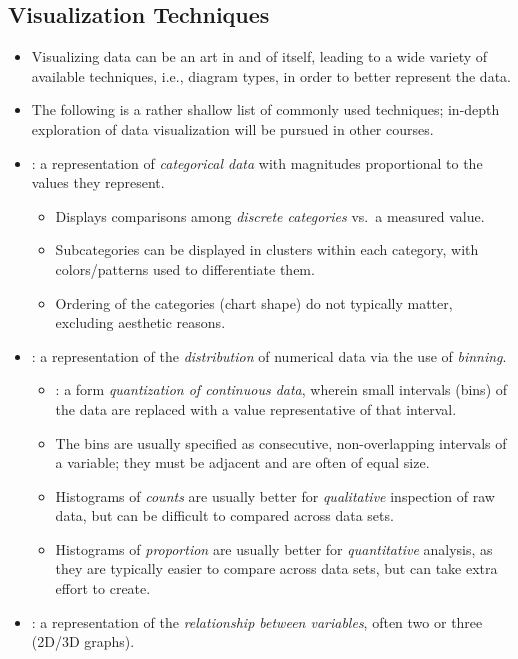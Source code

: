 \begin{itemize}
  \subsection{Visualization Techniques}
  \begin{itemize}
    \item Visualizing data can be an art in and of itself, leading to a wide variety of available techniques, i.e., diagram types, in order to better represent the data.
    \item The following is a rather shallow list of commonly used techniques; in-depth exploration of data visualization will be pursued in other courses.
    \item {}: a representation of \emph{categorical data} with magnitudes proportional to the values they represent. 
      \begin{itemize}
        \item Displays comparisons among \emph{discrete categories} vs.\ a measured value.
        \item Subcategories can be displayed in clusters within each category, with colors/patterns used to differentiate them.
        \item Ordering of the categories (chart shape) do not typically matter, excluding aesthetic reasons.
      \end{itemize}
    \item {}: a representation of the \emph{distribution} of numerical data via the use of \emph{binning}.
      \begin{itemize}
        \item {}: a form \emph{quantization of continuous data}, wherein small intervals (bins) of the data are replaced with a value representative of that interval.
        \item The bins are usually specified as consecutive, non-overlapping intervals of a variable; they must be adjacent and are often of equal size.
        \item Histograms of \emph{counts} are usually better for \emph{qualitative} inspection of raw data, but can be difficult to compared across data sets.
        \item Histograms of \emph{proportion} are usually better for \emph{quantitative} analysis, as they are typically easier to compare across data sets, but can take extra effort to create.
      \end{itemize}
    \item {}: a representation of the \emph{relationship between variables}, often two or three (2D/3D graphs).

\end{itemize}
\end{itemize}

